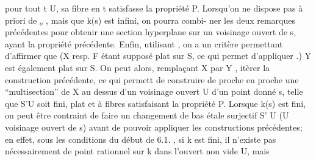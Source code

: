 pour tout t \hand{$\in$}U,  sa fibre  en  t satisfasse la propriété P.  Lorsqu'on ne
dispose pas à priori de \hand{$\xi$}$_{o}$ ,  mais que k(s) est infini, on pourra combi-%
ner les deux remarques précédentes pour obtenir une section hyperplane
sur un voisinage ouvert de s, ayant la propriété précédente.  Enfin,
utilisant  , on a un critère permettant d'affirmer que (X resp. F étant
supposé plat sur S, ce qui permet d'appliquer .)  Y\hand{$_{\xi}$}  est également
plat sur S. On peut alors, remplaçant X par Y\hand{$_{\xi}$} , itèrer la construction
précédente, ce qui permett  de construire de proche en proche une
``multisection''  de X au dessus d'un voisinage ouvert U d'un point donné s,
telle que S'\hand{$\longrightarrow$}U soit fini, plat et à fibres satisfaisant la propriété P.
Lorsque k(s) est fini, on peut être contraint de faire un changement de bas%
étale surjectif S'\hand{$\longrightarrow$} U (U voisinage ouvert de s) avant de pouvoir appliquer
les constructions précédentes; en effet, sous les conditions du début de
6.1. , si k est fini, il n'existe pas nécessairement de point rationnel sur
k dans  l'ouvert non vide U, mais 

